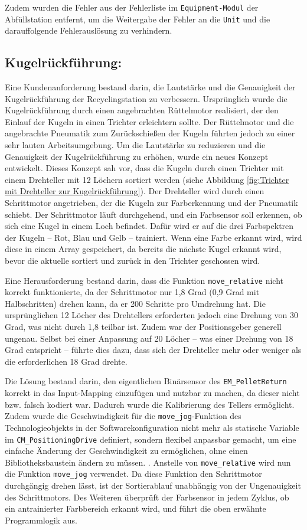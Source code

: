 Zudem wurden die Fehler aus der Fehlerliste im \texttt{Equipment-Modul} der Abfüllstation entfernt, um die Weitergabe der Fehler an die \texttt{Unit} und die darauffolgende Fehlerauslösung zu verhindern.  

\subsection{Kugelrückführung:}
Eine Kundenanforderung bestand darin, die Lautstärke und die Genauigkeit der Kugelrückführung der Recyclingstation zu verbessern. Ursprünglich wurde die Kugelrückführung durch einen angebrachten Rüttelmotor realisiert, der den Einlauf der Kugeln in einen Trichter erleichtern sollte. Der Rüttelmotor und die angebrachte Pneumatik zum Zurückschießen der Kugeln führten jedoch zu einer sehr lauten Arbeitsumgebung. Um die Lautstärke zu reduzieren und die Genauigkeit der Kugelrückführung zu erhöhen, wurde ein neues Konzept entwickelt. Dieses Konzept sah vor, dass die Kugeln durch einen Trichter mit einem Drehteller mit 12 Löchern sortiert werden (siehe Abbildung \ref{fig:Trichter mit Drehteller zur Kugelrückführung}). Der Drehteller wird durch einen Schrittmotor angetrieben, der die Kugeln zur Farberkennung und der Pneumatik schiebt. Der Schrittmotor läuft durchgehend, und ein Farbsensor soll erkennen, ob sich eine Kugel in einem Loch befindet. Dafür wird er auf die drei Farbspektren der Kugeln – Rot, Blau und Gelb – trainiert. Wenn eine Farbe erkannt wird, wird diese in einem Array gespeichert, da bereits die nächste Kugel erkannt wird, bevor die aktuelle sortiert und zurück in den Trichter geschossen wird.  

Eine Herausforderung bestand darin, dass die Funktion \texttt{move\_relative} nicht korrekt funktionierte, da der Schrittmotor nur 1,8 Grad (0,9 Grad mit Halbschritten) drehen kann, da er 200 Schritte pro Umdrehung hat. Die ursprünglichen 12 Löcher des Drehtellers erforderten jedoch eine Drehung von 30 Grad, was nicht durch 1,8 teilbar ist. Zudem war der Positionsgeber generell ungenau. Selbst bei einer Anpassung auf 20 Löcher – was einer Drehung von 18 Grad entspricht – führte dies dazu, dass sich der Drehteller mehr oder weniger als die erforderlichen 18 Grad drehte.  

Die Lösung bestand darin, den eigentlichen Binärsensor des \texttt{EM\_PelletReturn} korrekt in das Input-Mapping einzufügen und nutzbar zu machen, da dieser nicht bzw. falsch kodiert war. Dadurch wurde die Kalibrierung des Tellers ermöglicht. Zudem wurde die Geschwindigkeit für die \texttt{move\_jog}-Funktion des Technologieobjekts in der Softwarekonfiguration nicht mehr als statische Variable im \texttt{CM\_PositioningDrive} definiert, sondern flexibel anpassbar gemacht, um eine einfache Änderung der Geschwindigkeit zu ermöglichen, ohne einen Bibliotheksbaustein ändern zu müssen. . Anstelle von \texttt{move\_relative} wird nun die Funktion \texttt{move\_jog} verwendet. Da diese Funktion den Schrittmotor durchgängig drehen lässt, ist der Sortierablauf unabhängig von der Ungenauigkeit des Schrittmotors. Des Weiteren überprüft der Farbsensor in jedem Zyklus, ob ein antrainierter Farbbereich erkannt wird, und führt die oben erwähnte Programmlogik aus.  

